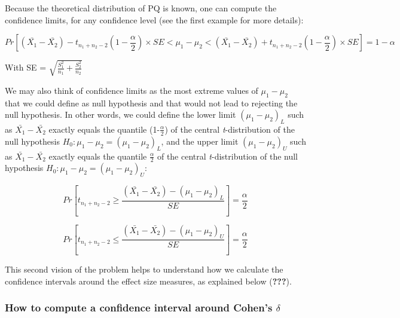 \documentclass[
  man,floatsintext]{apa6}
\begin{document}
Because the theoretical distribution of PQ is known, one can compute the confidence limits, for any confidence level (see the first example for more details):

\begin{equation} 
Pr[(\bar{X_1}-\bar{X_2}) - t_{n_1+n_2-2}(1-\frac{\alpha}{2}) \times SE < \mu_1-\mu_2 <(\bar{X_1}-\bar{X_2}) +t_{n_1+n_2-2}(1-\frac{\alpha}{2}) \times SE]= 1- \alpha
\label{eq:conflev6}
\end{equation}

With SE = \(\sqrt{\frac{S_1^2}{n_1}+\frac{S_2^2}{n_2}}\)

We may also think of confidence limits as the most extreme values of \(\mu_1-\mu_2\) that we could define as null hypothesis and that would not lead to rejecting the null hypothesis. In other words, we could define the lower limit \((\mu_1-\mu_2)_L\) such as \(\bar{X_1}-\bar{X_2}\) exactly equals the quantile (1-\(\frac{\alpha}{2}\)) of the central \emph{t}-distribution of the null hypothesis \(H_0: \mu_1 - \mu_2 = (\mu_1-\mu_2)_L\), and the upper limit \((\mu_1-\mu_2)_U\) such as \(\bar{X_1}-\bar{X_2}\) exactly equals the quantile \(\frac{\alpha}{2}\) of the central \emph{t}-distribution of the null hypothesis \(H_0: \mu_1 - \mu_2 = (\mu_1-\mu_2)_U\):

\begin{equation} 
Pr[t_{n_1+n_2-2} \geq \frac{(\bar{X_1}-\bar{X_2})-(\mu_1-\mu_2)_L}{SE}]= \frac{\alpha}{2}
\label{eq:plausiblelimit1}
\end{equation}

\begin{equation} 
Pr[t_{n_1+n_2-2} \leq \frac{(\bar{X_1}-\bar{X_2})-(\mu_1-\mu_2)_U}{SE}]= \frac{\alpha}{2}
\label{eq:plausiblelimit2}
\end{equation}

This second vision of the problem helps to understand how we calculate the confidence intervals around the effect size measures, as explained below ({\textbf{???}}).

\hypertarget{how-to-compute-a-confidence-interval-around-cohens-delta}{%
\subsubsection{\texorpdfstring{How to compute a confidence interval around Cohen's \(\delta\)}{How to compute a confidence interval around Cohen's \textbackslash delta}}\label{how-to-compute-a-confidence-interval-around-cohens-delta}}
\end{document}
